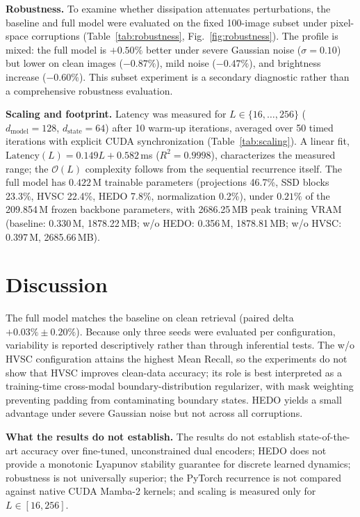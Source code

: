 \documentclass[runningheads,a4paper]{llncs}
\begin{document}
\textbf{Robustness.} To examine whether dissipation attenuates perturbations, the baseline and full model were evaluated on the fixed 100-image subset under pixel-space corruptions (Table~\ref{tab:robustness}, Fig.~\ref{fig:robustness}). The profile is mixed: the full model is $+0.50\%$ better under severe Gaussian noise ($\sigma=0.10$) but lower on clean images ($-0.87\%$), mild noise ($-0.47\%$), and brightness increase ($-0.60\%$). This subset experiment is a secondary diagnostic rather than a comprehensive robustness evaluation.

\textbf{Scaling and footprint.} Latency was measured for $L \in \{16, \dots, 256\}$ ($d_{\text{model}}=128$, $d_{\text{state}}=64$) after 10 warm-up iterations, averaged over 50 timed iterations with explicit CUDA synchronization (Table~\ref{tab:scaling}). A linear fit, $\text{Latency}(L) = 0.149 L + 0.582$\,ms ($R^2 = 0.9998$), characterizes the measured range; the $\mathcal{O}(L)$ complexity follows from the sequential recurrence itself. The full model has $0.422$\,M trainable parameters (projections 46.7\%, SSD blocks 23.3\%, HVSC 22.4\%, HEDO 7.8\%, normalization 0.2\%), under $0.21\%$ of the 209.854\,M frozen backbone parameters, with 2686.25\,MB peak training VRAM (baseline: 0.330\,M, 1878.22\,MB; w/o HEDO: 0.356\,M, 1878.81\,MB; w/o HVSC: 0.397\,M, 2685.66\,MB).

\section{Discussion}
\label{sec:discussion}

The full model matches the baseline on clean retrieval (paired delta $+0.03\% \pm 0.20\%$). Because only three seeds were evaluated per configuration, variability is reported descriptively rather than through inferential tests. The w/o HVSC configuration attains the highest Mean Recall, so the experiments do not show that HVSC improves clean-data accuracy; its role is best interpreted as a training-time cross-modal boundary-distribution regularizer, with mask weighting preventing padding from contaminating boundary states. HEDO yields a small advantage under severe Gaussian noise but not across all corruptions.

\textbf{What the results do not establish.} The results do not establish state-of-the-art accuracy over fine-tuned, unconstrained dual encoders; HEDO does not provide a monotonic Lyapunov stability guarantee for discrete learned dynamics; robustness is not universally superior; the PyTorch recurrence is not compared against native CUDA Mamba-2 kernels; and scaling is measured only for $L \in [16, 256]$.
\end{document}
